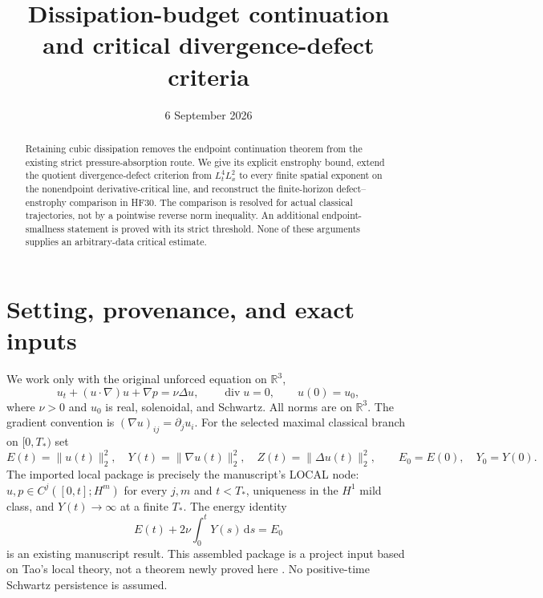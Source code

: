 \documentclass[11pt,a4paper]{article}
\title{Dissipation-budget continuation\\and critical divergence-defect criteria}
\author{}
\date{6 September 2026}
\theoremstyle{definition}\newtheorem{hypothesis}[theorem]{Hypothesis}
\theoremstyle{remark}\newtheorem{remark}[theorem]{Remark}
\newcommand{\R}{\mathbb R}
\newcommand{\dd}{\,\mathrm d}
\newcommand{\norm}[1]{\lVert #1\rVert}
\newcommand{\diver}{\operatorname{div}}
\numberwithin{equation}{section}
\begin{document}
\maketitle
\begin{abstract}
Retaining cubic dissipation removes the endpoint continuation theorem from
the existing strict pressure-absorption route. We give its explicit enstrophy
bound, extend the quotient divergence-defect criterion from $L^4_tL^2_x$ to
every finite spatial exponent on the nonendpoint derivative-critical line,
and reconstruct the finite-horizon defect--enstrophy comparison in HF30.
The comparison is resolved for actual classical trajectories, not by a
pointwise reverse norm inequality. An additional endpoint-smallness statement
is proved with its strict threshold. None of these arguments supplies an
arbitrary-data critical estimate.
\end{abstract}
\noindent{}

\section{Setting, provenance, and exact inputs}
We work only with the original unforced equation on $\R^3$,
\begin{equation}\label{db:NS}
 u_t+(u\cdot\nabla)u+\nabla p=\nu\Delta u,
 \qquad\diver u=0,\qquad u(0)=u_0,
\end{equation}
where $\nu>0$ and $u_0$ is real, solenoidal, and Schwartz. All norms are on
$\R^3$. The gradient convention is $(\nabla u)_{ij}=\partial_j u_i$.
For the selected maximal classical branch on $[0,T_*)$ set
\[
 E(t)=\norm{u(t)}_2^2,\quad Y(t)=\norm{\nabla u(t)}_2^2,
 \quad Z(t)=\norm{\Delta u(t)}_2^2,
 \qquad E_0=E(0),\quad Y_0=Y(0).
\]
The imported local package is precisely the manuscript's LOCAL node:
$u,p\in C^j([0,t];H^m)$ for every $j,m$ and $t<T_*$, uniqueness in the
$H^1$ mild class, and $Y(t)\to\infty$ at a finite $T_*$. The energy identity
\begin{equation}\label{db:energy}
 E(t)+2\nu\int_0^tY(s)\dd s=E_0
\end{equation}
is an existing manuscript result. This assembled package is a project input
based on Tao's local theory, not a theorem newly proved here \cite{paper,tao}.
No positive-time Schwartz persistence is assumed.
\end{document}
